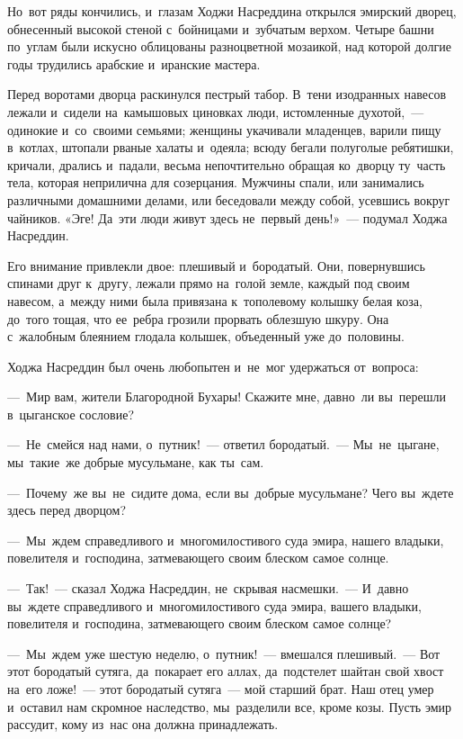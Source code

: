 \documentclass[12pt,a4paper]{book}
\begin{document}
Но~вот ряды кончились, и~глазам Ходжи Насреддина открылся эмирский дворец, обнесенный высокой стеной с~бойницами и~зубчатым верхом. Четыре башни по~углам были искусно облицованы разноцветной мозаикой, над которой долгие годы трудились арабские и~иранские мастера.

Перед воротами дворца раскинулся пестрый табор. В~тени изодранных навесов лежали и~сидели на~камышовых циновках люди, истомленные духотой,~— одинокие и~со~своими семьями; женщины укачивали младенцев, варили пищу в~котлах, штопали рваные халаты и~одеяла; всюду бегали полуголые ребятишки, кричали, дрались и~падали, весьма непочтительно обращая ко~дворцу ту~часть тела, которая неприлична для созерцания. Мужчины спали, или занимались различными домашними делами, или беседовали между собой, усевшись вокруг чайников. «Эге! Да~эти люди живут здесь не~первый день!»~— подумал Ходжа Насреддин.

Его внимание привлекли двое: плешивый и~бородатый. Они, повернувшись спинами друг к~другу, лежали прямо на~голой земле, каждый под своим навесом, а~между ними была привязана к~тополевому колышку белая коза, до~того тощая, что ее~ребра грозили прорвать облезшую шкуру. Она с~жалобным блеянием глодала колышек, объеденный уже до~половины.

Ходжа Насреддин был очень любопытен и~не~мог удержаться от~вопроса:

—~Мир вам, жители Благородной Бухары! Скажите мне, давно~ли вы~перешли в~цыганское сословие?

—~Не~смейся над нами, о~путник!~— ответил бородатый.~— Мы~не~цыгане, мы~такие~же добрые мусульмане, как ты~сам.

—~Почему~же вы~не~сидите дома, если вы~добрые мусульмане? Чего вы~ждете здесь перед дворцом?

—~Мы~ждем справедливого и~многомилостивого суда эмира, нашего владыки, повелителя и~господина, затмевающего своим блеском самое солнце.

—~Так!~— сказал Ходжа Насреддин, не~скрывая насмешки.~— И~давно вы~ждете справедливого и~многомилостивого суда эмира, вашего владыки, повелителя и~господина, затмевающего своим блеском самое солнце?

—~Мы~ждем уже шестую неделю, о~путник!~— вмешался плешивый.~— Вот этот бородатый сутяга, да~покарает его аллах, да~подстелет шайтан свой хвост на~его ложе!~— этот бородатый сутяга~— мой старший брат. Наш отец умер и~оставил нам скромное наследство, мы~разделили все, кроме козы. Пусть эмир рассудит, кому из~нас она должна принадлежать.
\end{document}
